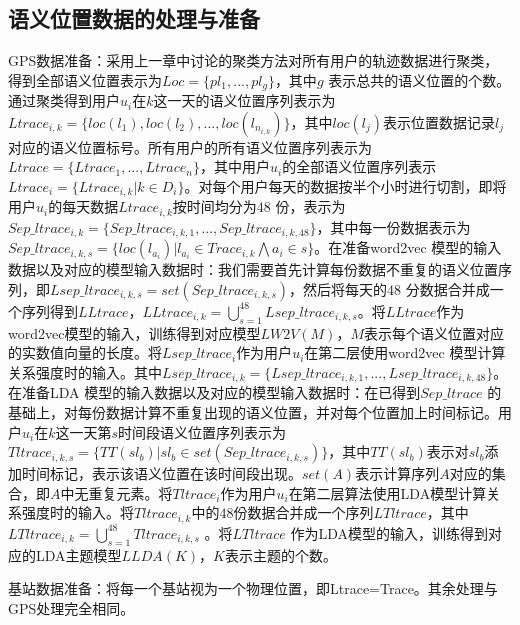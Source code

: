 \subsection{语义位置数据的处理与准备}
GPS数据准备：采用上一章中讨论的聚类方法对所有用户的轨迹数据进行聚类，得到全部语义位置表示为$Loc=\{pl_{1},...,pl_{g}\}$，其中$g$ 表示总共的语义位置的个数。通过聚类得到用户$u_{i}$在$k$这一天的语义位置序列表示为$Ltrace_{i,k}=\{loc(l_{1}),loc(l_{2}),...,loc(l_{n_{i,k}})\}$，其中$loc(l_{j})$表示位置数据记录$l_{j}$对应的语义位置标号。所有用户的所有语义位置序列表示为$Ltrace=\{Ltrace_{1},...,Ltrace_{n}\}$，其中用户$u_{i}$的全部语义位置序列表示$Ltrace_{i}=\{Ltrace_{i,k}|k\in D_{i}\}$。对每个用户每天的数据按半个小时进行切割，即将用户$u_{i}$的每天数据$Ltrace_{i,k}$按时间均分为$48$ 份，表示为$Sep\_ltrace_{i,k}=\{Sep\_ltrace_{i,k,1},...,Sep\_ltrace_{i,k,48}\}$，其中每一份数据表示为$Sep\_ltrace_{i,k,s}=\{loc(l_{a_{i}})|l_{a_{i}}\in Trace_{i,k}\bigwedge a_{i}\in s\}$。在准备word2vec 模型的输入数据以及对应的模型输入数据时：我们需要首先计算每份数据不重复的语义位置序列，即$Lsep\_ltrace_{i,k,s}=set(Sep\_ltrace_{i,k,s})$，然后将每天的$48$ 分数据合并成一个序列得到$LLtrace$，$LLtrace_{i,k}=\bigcup_{s=1}^{48}Lsep\_ltrace_{i,k,s}$。将$LLtrace$作为word2vec模型的输入，训练得到对应模型$LW2V(M)$，$M$表示每个语义位置对应的实数值向量的长度。将$Lsep\_ltrace_{i}$作为用户$u_{i}$在第二层使用word2vec 模型计算关系强度时的输入。其中$Lsep\_ltrace_{i,k}=\{Lsep\_ltrace_{i,k,1},...,Lsep\_ltrace_{i,k,48}\}$。在准备LDA 模型的输入数据以及对应的模型输入数据时：在已得到$Sep\_ltrace$ 的基础上，对每份数据计算不重复出现的语义位置，并对每个位置加上时间标记。用户$u_{i}$在$k$这一天第$s$时间段语义位置序列表示为$Tltrace_{i,k,s}=\{TT(sl_{b})|sl_b\in set(Sep\_ltrace_{i,k,s})\}$，其中$TT(sl_{b})$表示对$sl_{b}$添加时间标记，表示该语义位置在该时间段出现。$set(A)$表示计算序列$A$对应的集合，即$A$中无重复元素。将$Tltrace_{i}$作为用户$u_{i}$在第二层算法使用LDA模型计算关系强度时的输入。将$Tltrace_{i,k}$中的$48$份数据合并成一个序列$LTltrace$，其中$LTltrace_{i,k}=\bigcup_{s=1}^{48}Tltrace_{i,k,s}$ 。将$LTltrace$ 作为LDA模型的输入，训练得到对应的LDA主题模型$LLDA(K)$，$K$表示主题的个数。
\par 基站数据准备：将每一个基站视为一个物理位置，即Ltrace=Trace。其余处理与GPS处理完全相同。
